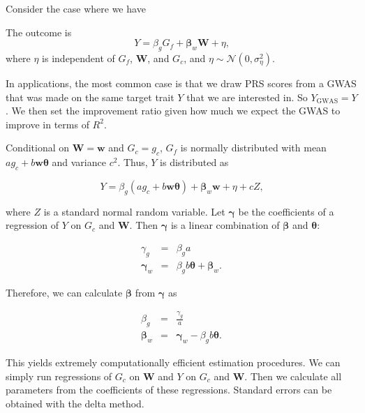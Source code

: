\documentclass[12pt]{article}
\begin{document}
Consider the case where we have
\begin{assumption}
    The outcome is
    \begin{equation*}
        Y = \beta_g G_f + \boldsymbol{\beta}_w \boldsymbol W + \eta\text{,}
    \end{equation*}
    where $\eta$ is independent of $G_f$, $\boldsymbol W$, and $G_c$, and $\eta \sim \mathcal N(0, \sigma^2_\eta)$.
    \label{assn:linear_model}
\end{assumption}

In applications, the most common case is that we draw PRS scores from a GWAS that was made on the same target trait $Y$ that we are interested in. So $Y_\text{GWAS} = Y$. We then set the improvement ratio given how much we expect the GWAS to improve in terms of $R^2$.

Conditional on $\boldsymbol W = \boldsymbol w$ and $G_c = g_c$, $G_f$ is normally distributed with mean $a g_c + b \boldsymbol w \boldsymbol \theta$ and variance $c^2$. Thus, $Y$ is distributed as

\[
    Y = \beta_g (a g_c + b \boldsymbol w \boldsymbol \theta) + \boldsymbol{\beta}_w \boldsymbol w + \eta + c Z\text{,}
\]

where $Z$ is a standard normal random variable. Let $\boldsymbol{\gamma}$ be the coefficients of a regression of $Y$ on $G_c$ and $\boldsymbol W$. Then $\boldsymbol{\gamma}$ is a linear combination of $\boldsymbol{\beta}$ and $\boldsymbol{\theta}$:

\begin{eqnarray}
    \label{eq:gamma_conversion_linear}
    \gamma_g
    &=&
    \beta_g a
    \\
    \boldsymbol{\gamma}_w
    &=&
    \beta_g b \boldsymbol \theta + \boldsymbol{\beta}_w\text{.}
\end{eqnarray}

Therefore, we can calculate $\boldsymbol{\beta}$ from $\boldsymbol{\gamma}$ as

\begin{eqnarray}
    \label{eq:beta_conversion_linear}
    \beta_g
    &=&
    \frac{\gamma_g}{a}
    \\
    \boldsymbol{\beta}_w
    &=&
    \boldsymbol{\gamma}_w - \beta_g b \boldsymbol \theta \text{.}
\end{eqnarray}

This yields extremely computationally efficient estimation procedures. We can simply run regressions of $G_c$ on $\boldsymbol{W}$ and $Y$ on $G_c$ and $\boldsymbol{W}$. Then we calculate all parameters from the coefficients of these regressions. Standard errors can be obtained with the delta method.
\end{document}
